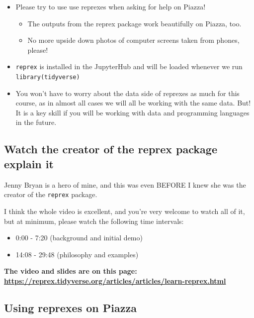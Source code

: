 \documentclass[
  openany]{book}
\providecommand{\tightlist}{%
  \setlength{\itemsep}{0pt}\setlength{\parskip}{0pt}}
\begin{document}
\begin{itemize}
\tightlist
\item
  Please try to use use reprexes when asking for help on Piazza!

  \begin{itemize}
  \tightlist
  \item
    The outputs from the reprex package work beautifully on Piazza, too.
  \item
    No more upside down photos of computer screens taken from phones, please!
  \end{itemize}
\item
  \texttt{reprex} is installed in the JupyterHub and will be loaded whenever we run \texttt{library(tidyverse)}
\item
  You won't have to worry about the data side of reprexes as much for this course, as in almost all cases we will all be working with the same data. But! It is a key skill if you will be working with data and programming languages in the future.
\end{itemize}

\hypertarget{watch-the-creator-of-the-reprex-package-explain-it}{%
\subsection{Watch the creator of the reprex package explain it}\label{watch-the-creator-of-the-reprex-package-explain-it}}

Jenny Bryan is a hero of mine, and this was even BEFORE I knew she was the creator of the \texttt{reprex} package.

I think the whole video is excellent, and you're very welcome to watch all of it, but at minimum, please watch the following time intervals:

\begin{itemize}
\tightlist
\item
  0:00 - 7:20 (background and initial demo)
\item
  14:08 - 29:48 (philosophy and examples)
\end{itemize}

\textbf{The video and slides are on this page: \url{https://reprex.tidyverse.org/articles/articles/learn-reprex.html}}

\hypertarget{using-reprexes-on-piazza}{%
\subsection{Using reprexes on Piazza}\label{using-reprexes-on-piazza}}
\end{document}
